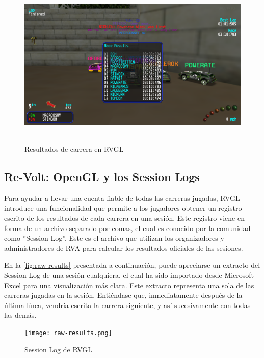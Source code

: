 \begin{figure}[H]
  \begin{center}
    \includegraphics[width=15cm, height=8cm]{img/results.png}
  \end{center}
  \caption[Resultados de carrera en RVGL]{Resultados de carrera en RVGL}
  \label{fig:results}
\end{figure}

\newpage

\subsection{Re-Volt: OpenGL y los Session Logs}
Para ayudar a llevar una cuenta fiable de todas las carreras jugadas, RVGL introduce una funcionalidad que permite a los jugadores obtener un registro escrito de los resultados de cada carrera en una sesión. Este registro viene en forma de un archivo separado por comas, el cual es conocido por la comunidad como ''Session Log''. Este es el archivo que utilizan los organizadores y administradores de RVA para calcular los resultados oficiales de las sesiones.

En la \autoref{fig:raw-results} presentada a continuación, puede apreciarse un extracto del Session Log de una sesión cualquiera, el cual ha sido importado desde Microsoft Excel para una visualización más clara. Este extracto representa una sola de las carreras jugadas en la sesión. Entiéndase que, inmediatamente después de la última línea, vendría escrita la carrera siguiente, y así sucesivamente con todas las demás.

\begin{figure}[H]
  \begin{center}
    \texttt{[image: raw-results.png]}
  \end{center}
  \caption[Session Log de RVGL]{Session Log de RVGL}
  \label{fig:raw-results}
\end{figure}

